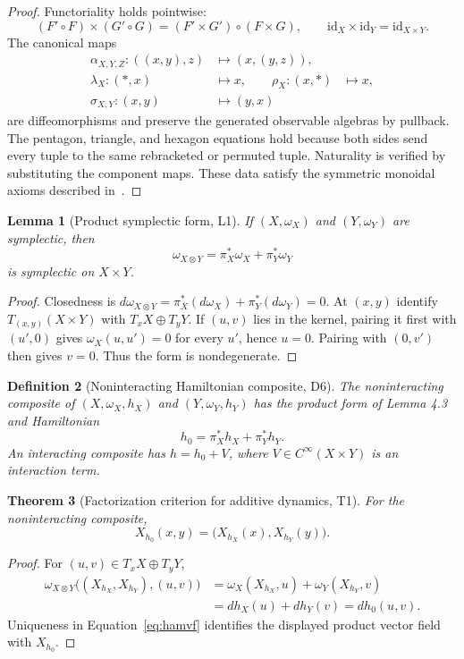 \documentclass[11pt]{article}
\newtheorem{definition}{Definition}[section]
\newtheorem{lemma}[definition]{Lemma}
\newtheorem{theorem}[definition]{Theorem}
\newcommand{\id}{\mathrm{id}}
\begin{document}
\begin{proof}
Functoriality holds pointwise:
\[
 (F'\circ F)\times(G'\circ G)
 =(F'\times G')\circ(F\times G),
 \qquad \id_X\times\id_Y=\id_{X\times Y}.
\]
The canonical maps
\begin{align*}
 \alpha_{X,Y,Z}:((x,y),z)&\mapsto(x,(y,z)),\\
 \lambda_X:(*,x)&\mapsto x,\qquad
 \rho_X:(x,*)&\mapsto x,\\
 \sigma_{X,Y}:(x,y)&\mapsto(y,x)
\end{align*}
are diffeomorphisms and preserve the generated observable algebras by pullback. The pentagon, triangle, and hexagon equations hold because both sides send every tuple to the same rebracketed or permuted tuple. Naturality is verified by substituting the component maps. These data satisfy the symmetric monoidal axioms described in~\cite[Ch.~XI]{MacLane1998}.
\end{proof}

\begin{lemma}[Product symplectic form, L1]
If $(X,\omega_X)$ and $(Y,\omega_Y)$ are symplectic, then
\[
 \omega_{X\otimes Y}=\pi_X^*\omega_X+\pi_Y^*\omega_Y
\]
is symplectic on $X\times Y$.
\end{lemma}

\begin{proof}
Closedness is
$d\omega_{X\otimes Y}=\pi_X^*(d\omega_X)+\pi_Y^*(d\omega_Y)=0$.
At $(x,y)$ identify $T_{(x,y)}(X\times Y)$ with $T_xX\oplus T_yY$. If $(u,v)$ lies in the kernel, pairing it first with $(u',0)$ gives $\omega_X(u,u')=0$ for every $u'$, hence $u=0$. Pairing with $(0,v')$ then gives $v=0$. Thus the form is nondegenerate.
\end{proof}

\begin{definition}[Noninteracting Hamiltonian composite, D6]
The noninteracting composite of $(X,\omega_X,h_X)$ and $(Y,\omega_Y,h_Y)$ has the product form of Lemma 4.3 and Hamiltonian
\[
 h_0=\pi_X^*h_X+\pi_Y^*h_Y.
\]
An interacting composite has $h=h_0+V$, where $V\in C^\infty(X\times Y)$ is an interaction term.
\end{definition}

\begin{theorem}[Factorization criterion for additive dynamics, T1]
For the noninteracting composite,
\[
 X_{h_0}(x,y)=\bigl(X_{h_X}(x),X_{h_Y}(y)\bigr).
\]
\end{theorem}

\begin{proof}
For $(u,v)\in T_xX\oplus T_yY$,
\begin{align*}
 \omega_{X\otimes Y}\bigl((X_{h_X},X_{h_Y}),(u,v)\bigr)
 &=\omega_X(X_{h_X},u)+\omega_Y(X_{h_Y},v)\\
 &=dh_X(u)+dh_Y(v)=dh_0(u,v).
\end{align*}
Uniqueness in Equation~\eqref{eq:hamvf} identifies the displayed product vector field with $X_{h_0}$.
\end{proof}
\end{document}
